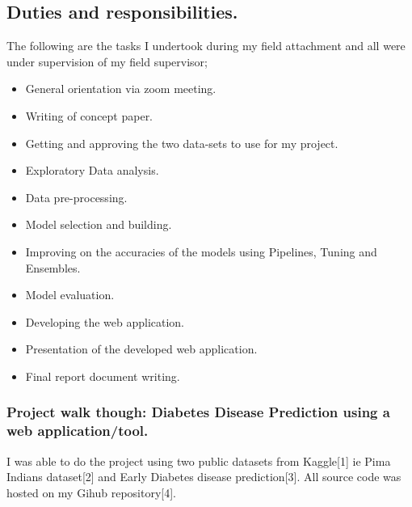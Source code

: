 \documentclass[11pt]{article}
\begin{document}
\subsection{Duties and responsibilities.}
The following are the tasks I undertook during my field attachment and all were under supervision of my field supervisor;
\begin{itemize}
	\item General orientation via zoom meeting.\\
	\item Writing of concept paper.\\
	\item Getting and approving the two data-sets to use for my project.\\
	\item Exploratory Data analysis.\\
	\item Data pre-processing.\\
	\item Model selection and building.\\
	\item Improving on the accuracies of the models using Pipelines, Tuning and Ensembles.\\
	\item Model evaluation.\\
	\item Developing the web application.\\
	\item Presentation of the developed web application.\\
	\item Final report document writing.\\
	
\end{itemize}
\newpage

\subsubsection{Project walk though: Diabetes Disease Prediction using a web application/tool.}
I was able to do the project using two public datasets from Kaggle[1] ie Pima Indians dataset[2] and Early Diabetes disease prediction[3]. All source code was hosted on my Gihub repository[4].\\
\end{document}
